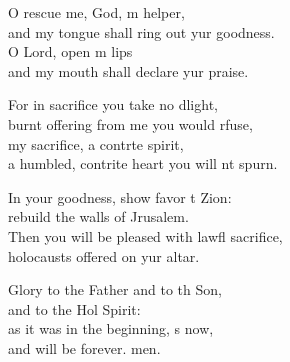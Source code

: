 \begin{psalmverse}
\begin{patverse}
O rescue me, God, m helper,\Med\\
and my tongue shall ring out yur goodness.\\
O Lord, open m lips\Med\\
and my mouth shall declare yur praise.

For in sacrifice you take no dlight,\Med\\
burnt offering from me you would rfuse,\\
my sacrifice, a contr\pointup{\i}te spirit,\Med\\
a humbled, contrite heart you will nt spurn.

In your goodness, show favor t Zion:\Med\\
rebuild the walls of Jrusalem.\\
Then you will be pleased with lawfl sacrifice,\Med\\
holocausts offered on yur altar.

Glory to the Father and to th Son,\Med\\
and to the Hol Spirit:\\
as it was in the beginning, \pointup{\i}s now,\Med\\
and will be forever. men.
  \end{patverse}
\end{psalmverse}
